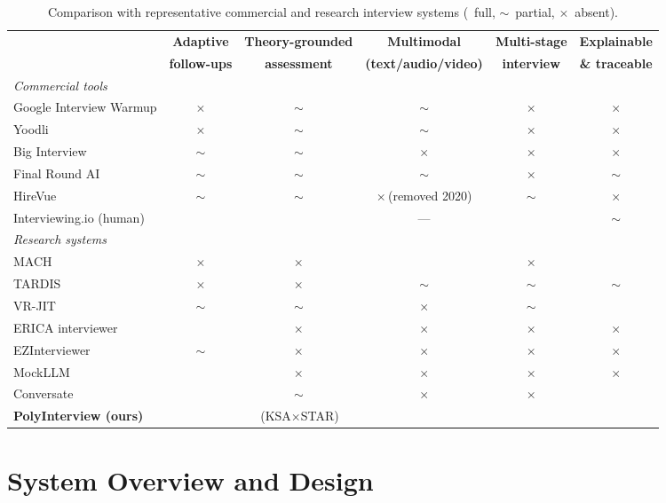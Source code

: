 \documentclass[11pt]{article}
\newcommand{\yes}{\textcolor{green!55!black}{\checkmark}}
\newcommand{\pmark}{\textcolor{orange!85!black}{$\sim$}}
\newcommand{\no}{\textcolor{red!70!black}{$\times$}}
\begin{document}
\begin{table}[t]
\centering\small
\setlength{\tabcolsep}{4pt}
\begin{tabular}{lccccc}
\toprule
& \textbf{Adaptive} & \textbf{Theory-grounded} & \textbf{Multimodal} & \textbf{Multi-stage} & \textbf{Explainable} \\
& \textbf{follow-ups} & \textbf{assessment} & \textbf{(text/audio/video)} & \textbf{interview} & \textbf{\& traceable} \\
\midrule
\multicolumn{6}{l}{\emph{Commercial tools}} \\
Google Interview Warmup & \no & \pmark & \pmark & \no & \no \\
Yoodli & \no & \pmark & \pmark & \no & \no \\
Big Interview & \pmark & \pmark & \no & \no & \no \\
Final Round AI & \pmark & \pmark & \pmark & \no & \pmark \\
HireVue & \pmark & \pmark & \no\,(removed 2020) & \pmark & \no \\
Interviewing.io (human) & \yes & \yes & --- & \yes & \pmark \\
\midrule
\multicolumn{6}{l}{\emph{Research systems}} \\
MACH \citep{hoque2013mach} & \no & \no & \yes & \no & \yes \\
TARDIS \citep{anderson2013tardis} & \no & \no & \pmark & \pmark & \pmark \\
VR-JIT \citep{smith2014virtual} & \pmark & \pmark & \no & \pmark & \yes \\
ERICA interviewer \citep{inoue2020jobinterviewer} & \yes & \no & \no & \no & \no \\
EZInterviewer \citep{li2023ezinterviewer} & \pmark & \no & \no & \no & \no \\
MockLLM \citep{sun2025mockllm} & \yes & \no & \no & \no & \no \\
Conversate \citep{daryanto2025conversate} & \yes & \pmark & \no & \no & \yes \\
\midrule
\textbf{PolyInterview (ours)} & \yes & \yes\,(KSA$\times$STAR) & \yes & \yes & \yes \\
\bottomrule
\end{tabular}
\caption{Comparison with representative commercial and research interview systems (\yes\ full, \pmark\ partial, \no\ absent).}
\label{tab:compare}
\end{table}

\section{System Overview and Design}
\label{sec:system}
\end{document}
